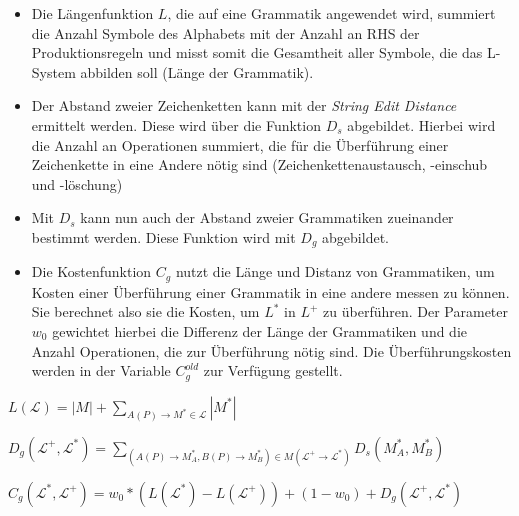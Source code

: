 \begin{itemize}
    \item Die Längenfunktion $L$, die auf eine Grammatik angewendet wird, summiert die Anzahl Symbole des Alphabets mit
    der Anzahl an RHS der Produktionsregeln und misst somit die Gesamtheit aller Symbole, die das L-System abbilden soll
    (Länge der Grammatik).
    \item Der Abstand zweier Zeichenketten kann mit der \textit{String Edit Distance} ermittelt werden. Diese wird über
    die Funktion $D_s$ abgebildet. Hierbei wird die Anzahl an Operationen summiert, die für die Überführung einer Zeichenkette
    in eine Andere nötig sind (Zeichenkettenaustausch, -einschub und -löschung)
    \item Mit $D_s$ kann nun auch der Abstand zweier Grammatiken zueinander bestimmt werden. Diese Funktion wird mit
    $D_g$ abgebildet.
    \item Die Kostenfunktion $C_g$ nutzt die Länge und Distanz von Grammatiken, um Kosten einer Überführung einer Grammatik
    in eine andere messen zu können. Sie berechnet also sie die Kosten, um $L^*$ in $L^+$ zu überführen.
    Der Parameter $w_0$ gewichtet hierbei die Differenz der Länge der Grammatiken und die Anzahl Operationen, die zur
    Überführung nötig sind. Die Überführungskosten werden in der Variable $C^{old}_g$ zur Verfügung gestellt.
\end{itemize}

\begin{algorithm}[caption={Längenfunktion $L$ für Grammatiken}]
$L(\mathcal{L}) = |M| + \sum\limits_{A(P) \rightarrow M^* \in \mathcal{L}} |M^*|$
\end{algorithm}

\begin{algorithm}[caption={Grammar Edit Distance}]
$D_g(\mathcal{L}^+, \mathcal{L}^*)= \sum\limits_{(A(P) \rightarrow M^*_A , B(P) \rightarrow M^*_B) \in M(\mathcal{L^+} \rightarrow \mathcal{L^*})} D_s(M^*_A, M^*_B)$
\end{algorithm}

\begin{algorithm}[caption={Kostenfunktion $C_g$ mit Gewichtung $w_0$}]
$C_g(\mathcal{L}^*, \mathcal{L}^+) = w_0 * (L(\mathcal{L}^*) - L(\mathcal{L}^+)) + (1 - w_0) + D_g(\mathcal{L}^+, \mathcal{L}^*)$
\end{algorithm}

\newpage

